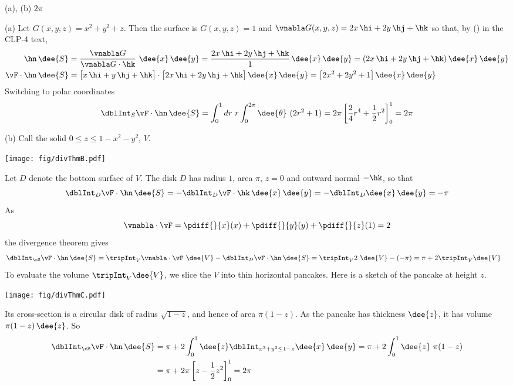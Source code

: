\begin{answer} 
(a), (b) $2\pi$
\end{answer}

\begin{solution} 
(a)  Let $G(x,y,z) = x^2+y^2+z$. Then the surface is $G(x,y,z)=1$
and $\vnabla G(x,y,z) = 2x\,\hi+2y\,\hj+\hk$ so that,
by () in the CLP-4 text, 
\begin{align*}
\hn\,\dee{S}&=\frac{\vnabla G}{\vnabla G\cdot\hk}\ \dee{x}\,\dee{y}
=\frac{2x\,\hi+2y\,\hj+\hk}{1}\,\dee{x}\,\dee{y}
=(2x\,\hi+2y\,\hj+\hk)\,\dee{x}\,\dee{y}\\
\vF\cdot\hn\,\dee{S}
&=\big[x\,\hi+y\,\hj+\hk\big]\cdot
          \big[2x\,\hi+2y\,\hj+\hk\big]\,\dee{x}\,\dee{y}
=\big[2x^2+2y^2+1\big]\,\dee{x}\,\dee{y}
\end{align*}
Switching to polar coordinates
\begin{equation*}
\dblInt_S\vF\cdot \hn\,\dee{S}
=\int_0^1dr\ r\int_0^{2\pi}\dee{\theta}\ (2r^2+1)
=2\pi\left[\frac{2}{4} r^4+\frac{1}{2} r^2\right]_0^1
=2\pi
\end{equation*}

(b) Call the solid $0\le z\le 1-x^2-y^2$, $V$.
\begin{center}
       \texttt{[image: fig/divThmB.pdf]}
\end{center}
Let  $D$ denote the bottom surface of $V$.
The disk $D$ has radius $1$, area $\pi$, $z=0$ and outward normal $-\hk$, 
so that
\begin{equation*}
\dblInt_{D}\vF\cdot\hn\,\dee{S}
=-\dblInt_{D}\vF\cdot\hk\,\dee{x}\,\dee{y}
=-\dblInt_{D}\dee{x}\,\dee{y}
=-\pi
\end{equation*}
As
\begin{equation*}
\vnabla\cdot\vF
=\pdiff{}{x}(x)
+\pdiff{}{y}(y)
+\pdiff{}{z}(1)
=2
\end{equation*}
the divergence theorem gives
\begin{align*}
\dblInt_{\cS}\vF\cdot\hn\,\dee{S}
&=\tripInt_V\vnabla\cdot\vF\ \dee{V}
-\dblInt_{D}\vF\cdot\hn\,\dee{S}
=\tripInt_V 2\ \dee{V} -(-\pi)
=\pi + 2\tripInt_V \dee{V} 
\end{align*}
To evaluate the volume $\tripInt_V \dee{V}$, we slice the $V$ into
thin horizontal pancakes. Here is a sketch of the pancake at height
$z$.
\begin{center}
       \texttt{[image: fig/divThmC.pdf]}
\end{center}
Its cross-section is a circular disk of radius $\sqrt{1-z}$,
and hence of area $\pi(1-z)$. As the pancake has thickness $\dee{z}$, 
it has volume $\pi(1-z)\,\dee{z}$. So
\begin{align*}
\dblInt_{\cS}\vF\cdot\hn\,\dee{S}
&=\pi+2\int_0^1 \dee{z}\dblInt_{x^2+y^2\le 1-z} \dee{x}\,\dee{y}
=\pi+2\int_0^1 \dee{z}\ \pi(1-z)\\
&=\pi+2\pi\left[z-\frac{1}{2}z^2\right]_0^1
=2\pi
\end{align*}
\end{solution}

